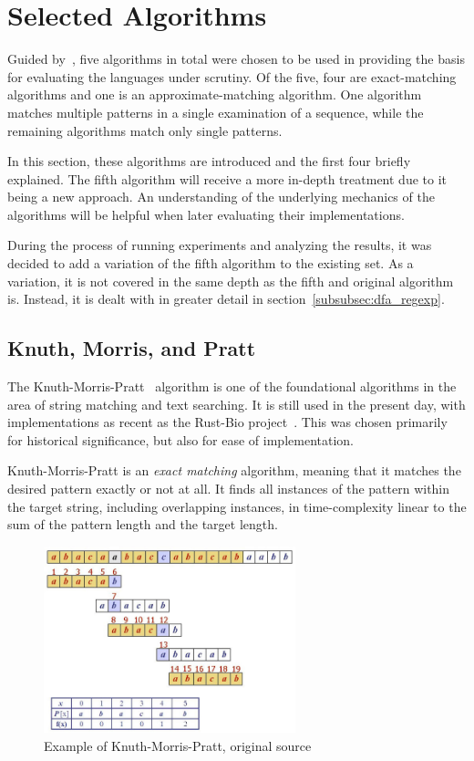 \section{Selected Algorithms}
\label{sec:algorithms}

Guided by~\cite{rahate}, five algorithms in total were chosen to be used in providing the basis for evaluating the languages under scrutiny. Of the five, four are exact-matching algorithms and one is an approximate-matching algorithm. One algorithm matches multiple patterns in a single examination of a sequence, while the remaining algorithms match only single patterns.

In this section, these algorithms are introduced and the first four briefly explained. The fifth algorithm will receive a more in-depth treatment due to it being a new approach. An understanding of the underlying mechanics of the algorithms will be helpful when later evaluating their implementations.

During the process of running experiments and analyzing the results, it was decided to add a variation of the fifth algorithm to the existing set. As a variation, it is not covered in the same depth as the fifth and original algorithm is. Instead, it is dealt with in greater detail in section~\ref{subsubsec:dfa_regexp}.

\subsection{Knuth, Morris, and Pratt}

The Knuth-Morris-Pratt~\cite{knuth} algorithm is one of the foundational algorithms in the area of string matching and text searching. It is still used in the present day, with implementations as recent as the Rust-Bio project~\cite{rust}. This was chosen primarily for historical significance, but also for ease of implementation.

Knuth-Morris-Pratt is an \textit{exact matching} algorithm, meaning that it matches the desired pattern exactly or not at all. It finds all instances of the pattern within the target string, including overlapping instances, in time-complexity linear to the sum of the pattern length and the target length.

\begin{figure}[ht]
    \centering
    \includegraphics[width=0.65\textwidth]{figures/kmpexample.jpg}
    \caption[Example of Knuth-Morris-Pratt algorithm]{Example of Knuth-Morris-Pratt, original source~\cite{shandilya}}
    \label{fig:image:kmpexample}
\end{figure}

